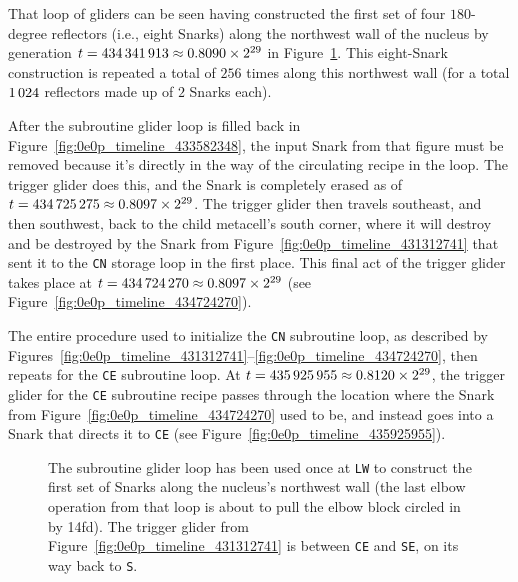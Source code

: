 That loop of gliders can be seen having constructed the first set of four $180$-degree reflectors (i.e., eight Snarks) along the northwest wall of the nucleus by generation $t = 434{\,}341{\,}913 \approx 0.8090 \times 2^{29}$ in Figure~\ref{fig:0e0p_timeline_434341913}. This eight-Snark construction is repeated a total of $256$ times along this northwest wall (for a total $1{\,}024$ reflectors made up of $2$ Snarks each).

After the subroutine glider loop is filled back in Figure~\ref{fig:0e0p_timeline_433582348}, the input Snark from that figure must be removed because it's directly in the way of the circulating recipe in the loop. The trigger glider does this, and the Snark is completely erased as of $t = 434{\,}725{\,}275 \approx 0.8097 \times 2^{29}$. The trigger glider then travels southeast, and then southwest, back to the child metacell's south corner, where it will destroy and be destroyed by the Snark from Figure~\ref{fig:0e0p_timeline_431312741} that sent it to the \texttt{CN} storage loop in the first place. This final act of the trigger glider takes place at $t = 434{\,}724{\,}270 \approx 0.8097 \times 2^{29}$ (see Figure~\ref{fig:0e0p_timeline_434724270}).

The entire procedure used to initialize the \texttt{CN} subroutine loop, as described by Figures~\ref{fig:0e0p_timeline_431312741}--\ref{fig:0e0p_timeline_434724270}, then repeats for the \texttt{CE} subroutine loop. At $t = 435{\,}925{\,}955 \approx 0.8120 \times 2^{29}$, the trigger glider for the \texttt{CE} subroutine recipe passes through the location where the Snark from Figure~\ref{fig:0e0p_timeline_434724270} used to be, and instead goes into a Snark that directs it to \texttt{CE} (see Figure~\ref{fig:0e0p_timeline_435925955}).

\begin{figure}[!htb]
	\centering
	\caption{The subroutine glider loop has been used once at \texttt{LW} to construct the first set of Snarks along the nucleus's northwest wall (the last elbow operation from that loop is about to pull the elbow block circled in  by 14fd). The trigger glider from Figure~\ref{fig:0e0p_timeline_431312741} is between \texttt{CE} and \texttt{SE}, on its way back to \texttt{S}.}
	\label{fig:0e0p_timeline_434341913}
\end{figure}

